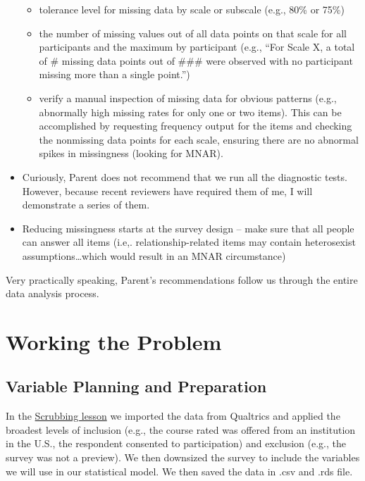 \documentclass[
  11pt,
]{book}
\providecommand{\tightlist}{%
  \setlength{\itemsep}{0pt}\setlength{\parskip}{0pt}}
\begin{document}
\begin{itemize}
  \begin{itemize}
  \tightlist
  \item
    tolerance level for missing data by scale or subscale (e.g., 80\% or 75\%)
  \item
    the number of missing values out of all data points on that scale for all participants and the maximum by participant (e.g., ``For Scale X, a total of \# missing data points out of \#\#\# were observed with no participant missing more than a single point.'')
  \item
    verify a manual inspection of missing data for obvious patterns (e.g., abnormally high missing rates for only one or two items). This can be accomplished by requesting frequency output for the items and checking the nonmissing data points for each scale, ensuring there are no abnormal spikes in missingness (looking for MNAR).
  \end{itemize}
\item
  Curiously, Parent \citeyearpar{parent_handling_2013} does not recommend that we run all the diagnostic tests. However, because recent reviewers have required them of me, I will demonstrate a series of them.
\item
  Reducing missingness starts at the survey design -- make sure that all people can answer all items (i.e,. relationship-related items may contain heterosexist assumptions\ldots which would result in an MNAR circumstance)
\end{itemize}

Very practically speaking, Parent's \citeyearpar{parent_handling_2013} recommendations follow us through the entire data analysis process.

\hypertarget{working-the-problem-1}{%
\section{Working the Problem}\label{working-the-problem-1}}

\hypertarget{variable-planning-and-preparation}{%
\subsection{Variable Planning and Preparation}\label{variable-planning-and-preparation}}

In the \protect\hyperlink{scrub}{Scrubbing lesson} we imported the data from Qualtrics and applied the broadest levels of inclusion (e.g., the course rated was offered from an institution in the U.S., the respondent consented to participation) and exclusion (e.g., the survey was not a preview). We then downsized the survey to include the variables we will use in our statistical model. We then saved the data in .csv and .rds file.
\end{document}
